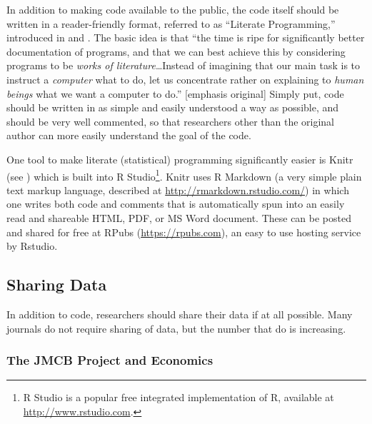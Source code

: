 \documentclass[12pt] {article}
\begin{document}
In addition to making code available to the public, the code itself
should be written in a reader-friendly format, referred to as ``Literate
Programming,'' introduced in \cite{knuth_literate_1984} and \cite{knuth_literate_1992}. The basic
idea is that ``the time is ripe for significantly better documentation
of programs, and that we can best achieve this by considering programs
to be \emph{works of literature}\ldots{}Instead of imagining that our
main task is to instruct a \emph{computer} what to do, let us
concentrate rather on explaining to \emph{human beings} what we want a
computer to do.'' {[}emphasis original{]} Simply put, code should be
written in as simple and easily understood a way as possible, and should
be very well commented, so that researchers other than the original
author can more easily understand the goal of the code.

One tool to make literate (statistical) programming significantly easier
is Knitr (see \cite{xie_dynamic_2013, xie_knitr:_2014}) which is built into R
Studio\footnote{R Studio is a popular free integrated implementation of
  R, available at \href{stylesWithEffects.xml}{http://www.rstudio.com}.}.
Knitr uses R Markdown (a very simple plain text markup language,
described at \url{http://rmarkdown.rstudio.com/}) in which one writes
both code and comments that is automatically spun into an easily read
and shareable HTML, PDF, or MS Word document. These can be posted and
shared for free at RPubs (\url{https://rpubs.com}), an easy to use
hosting service by Rstudio.



\subsection{Sharing Data}\label{sharing-data}

In addition to code, researchers should share their data if at all
possible. Many journals do not require sharing of data, but the number
that do is increasing.

\subsubsection{The JMCB Project and
Economics}\label{the-jmcb-project-and-economics}
\end{document}
